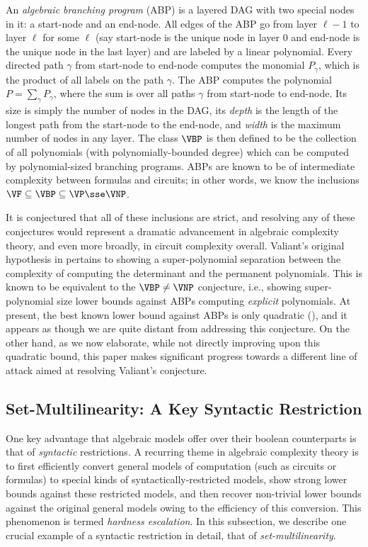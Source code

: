 \documentclass{article}
\begin{document}
An \emph{algebraic branching program} (ABP) is a layered DAG with two special nodes in
it: a start-node and an end-node. All edges of the ABP go from layer $\ell -1$ to layer $\ell$ for some $\ell$ (say start-node is the unique node in layer $0$ and end-node is the unique node in the last layer) and are labeled by a linear polynomial. Every directed path $\gamma$ from start-node to end-node computes the monomial $P_\gamma$,
which is the product of all labels on the path $\gamma$. The ABP computes the polynomial $P = \sum_{\gamma} P_\gamma$,
where the sum is over all paths $\gamma$ from start-node to end-node. Its size is simply the number of nodes in the DAG, its \emph{depth} is the length of the longest path from the start-node to the end-node, and \emph{width} is the maximum number of nodes in any layer. The class $\VBP$ is then defined to be the collection of all polynomials (with polynomially-bounded degree) which can be computed by polynomial-sized branching programs. ABPs are known to be of intermediate complexity between formulas and circuits; in other words, we know the inclusions $\VF\subseteq\VBP \subseteq \VP\sse \VNP$.

It is conjectured that all of these inclusions are strict, and resolving any of these conjectures would represent a dramatic advancement in algebraic complexity theory, and even more broadly, in circuit complexity overall. Valiant's original hypothesis in \cite{Val79} pertains to showing a super-polynomial separation between the complexity of computing the determinant and the permanent polynomials.
This is known to be equivalent to the $\VBP \neq \VNP$ conjecture, i.e., showing super-polynomial size lower bounds against ABPs computing \emph{explicit} polynomials. 
At present, the best known lower bound against ABPs is only quadratic (\cite{ ChatterjeeKSV22}), and it appears as though we are quite distant from addressing this conjecture. On the other hand, as we now elaborate, while not directly improving upon this quadratic bound, this paper makes significant progress towards a different line of attack aimed at resolving Valiant's conjecture.

\subsection{Set-Multilinearity: A Key Syntactic Restriction}\label{subsec:sml}
One key advantage that algebraic models offer over their boolean counterparts is that of \emph{syntactic} restrictions. 
A recurring theme in algebraic complexity theory is to first efficiently convert general models of computation (such as circuits or formulas) to special kinds of syntactically-restricted models, show strong lower bounds against these restricted models, and then recover non-trivial lower bounds against the original general models owing to the efficiency of this conversion. This phenomenon is termed \emph{hardness escalation}. 
In this subsection, we describe one crucial example of a syntactic restriction in detail, that of \emph{set-multilinearity}.
\end{document}
